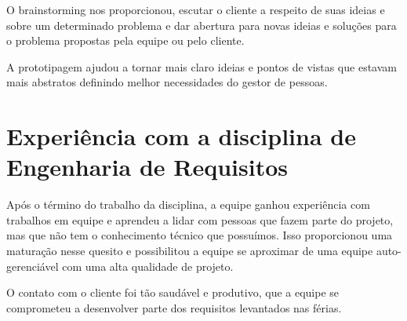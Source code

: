 O brainstorming nos proporcionou, escutar o cliente a respeito de suas ideias e sobre um determinado problema e dar abertura para novas ideias e soluções para o problema propostas pela equipe ou pelo cliente. 

A prototipagem ajudou a tornar mais claro ideias e pontos de vistas que estavam mais abstratos definindo melhor necessidades do gestor de pessoas.

\section{Experiência com a disciplina de Engenharia de Requisitos}

Após o término do trabalho da disciplina, a equipe ganhou experiência com trabalhos em equipe e aprendeu a lidar com pessoas que fazem parte do projeto, mas que não tem o conhecimento técnico que possuímos. Isso proporcionou uma maturação nesse quesito  e possibilitou a equipe se aproximar de uma equipe auto-gerenciável com uma alta qualidade de projeto.

O contato com o cliente foi tão saudável e produtivo, que a equipe se comprometeu a desenvolver parte dos requisitos levantados nas férias.
